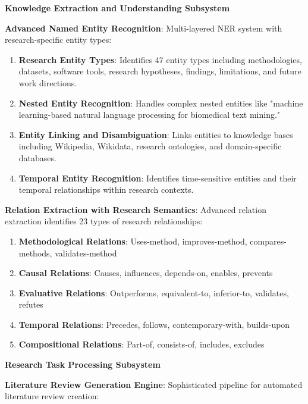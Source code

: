 \documentclass[10pt,twocolumn]{article}
\begin{document}
\textbf{Knowledge Extraction and Understanding Subsystem}

\textbf{Advanced Named Entity Recognition}: Multi-layered NER system with research-specific entity types:

\begin{enumerate}
    \item \textbf{Research Entity Types}: Identifies 47 entity types including methodologies, datasets, software tools, research hypotheses, findings, limitations, and future work directions.
    
    \item \textbf{Nested Entity Recognition}: Handles complex nested entities like "machine learning-based natural language processing for biomedical text mining."
    
    \item \textbf{Entity Linking and Disambiguation}: Links entities to knowledge bases including Wikipedia, Wikidata, research ontologies, and domain-specific databases.
    
    \item \textbf{Temporal Entity Recognition}: Identifies time-sensitive entities and their temporal relationships within research contexts.
\end{enumerate}

\textbf{Relation Extraction with Research Semantics}: Advanced relation extraction identifies 23 types of research relationships:

\begin{enumerate}
    \item \textbf{Methodological Relations}: Uses-method, improves-method, compares-methods, validates-method
    \item \textbf{Causal Relations}: Causes, influences, depends-on, enables, prevents
    \item \textbf{Evaluative Relations}: Outperforms, equivalent-to, inferior-to, validates, refutes
    \item \textbf{Temporal Relations}: Precedes, follows, contemporary-with, builds-upon
    \item \textbf{Compositional Relations}: Part-of, consists-of, includes, excludes
\end{enumerate}

\textbf{Research Task Processing Subsystem}

\textbf{Literature Review Generation Engine}: Sophisticated pipeline for automated literature review creation:
\end{document}
